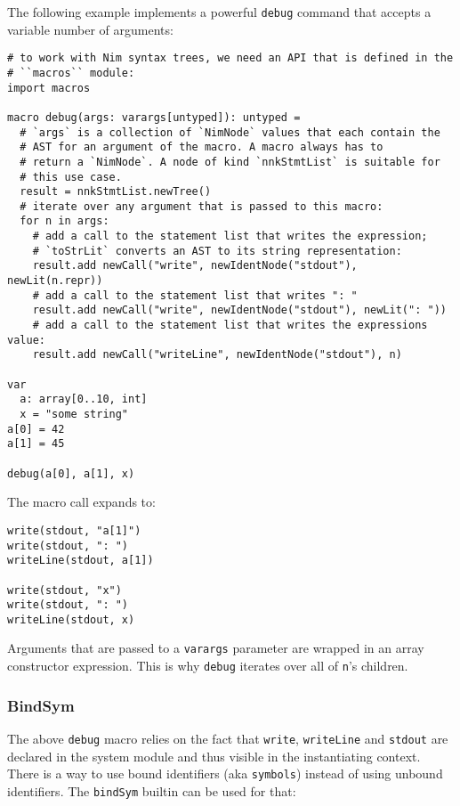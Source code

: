 The following example implements a powerful \texttt{debug} command that
accepts a variable number of arguments:

\begin{verbatim}
# to work with Nim syntax trees, we need an API that is defined in the
# ``macros`` module:
import macros

macro debug(args: varargs[untyped]): untyped =
  # `args` is a collection of `NimNode` values that each contain the
  # AST for an argument of the macro. A macro always has to
  # return a `NimNode`. A node of kind `nnkStmtList` is suitable for
  # this use case.
  result = nnkStmtList.newTree()
  # iterate over any argument that is passed to this macro:
  for n in args:
    # add a call to the statement list that writes the expression;
    # `toStrLit` converts an AST to its string representation:
    result.add newCall("write", newIdentNode("stdout"), newLit(n.repr))
    # add a call to the statement list that writes ": "
    result.add newCall("write", newIdentNode("stdout"), newLit(": "))
    # add a call to the statement list that writes the expressions value:
    result.add newCall("writeLine", newIdentNode("stdout"), n)

var
  a: array[0..10, int]
  x = "some string"
a[0] = 42
a[1] = 45

debug(a[0], a[1], x)
\end{verbatim}

The macro call expands to:

\begin{verbatim}
write(stdout, "a[1]")
write(stdout, ": ")
writeLine(stdout, a[1])

write(stdout, "x")
write(stdout, ": ")
writeLine(stdout, x)
\end{verbatim}

Arguments that are passed to a \texttt{varargs} parameter are wrapped in
an array constructor expression. This is why \texttt{debug} iterates
over all of \texttt{n}'s children.

\hypertarget{bindsym}{%
\subsubsection{BindSym}\label{bindsym}}

The above \texttt{debug} macro relies on the fact that \texttt{write},
\texttt{writeLine} and \texttt{stdout} are declared in the system module
and thus visible in the instantiating context. There is a way to use
bound identifiers (aka \texttt{symbols}) instead of using unbound
identifiers. The \texttt{bindSym} builtin can be used for that:

